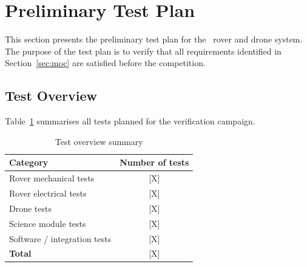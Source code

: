 %

\section{Preliminary Test Plan}
\label{sec:test_plan}

This section presents the preliminary test plan for the \teamname\ rover and
drone system. The purpose of the test plan is to verify that all requirements
identified in Section~\ref{sec:moc} are satisfied before the competition.

\subsection{Test Overview}
\label{subsec:tp_overview}

Table~\ref{tab:test_summary} summarises all tests planned for the
verification campaign.

\begin{table}[H]
    \centering
    \caption{Test overview summary}
    \label{tab:test_summary}
    \begin{tabular}{lc}
        \toprule
        \textbf{Category}        & \textbf{Number of tests} \\
        \midrule
        Rover mechanical tests   & [X] \\
        Rover electrical tests   & [X] \\
        Drone tests   & [X] \\
        Science module tests   & [X] \\
        Software / integration tests & [X] \\
        \midrule
        \textbf{Total}           & [X] \\
        \bottomrule
    \end{tabular}
\end{table}


